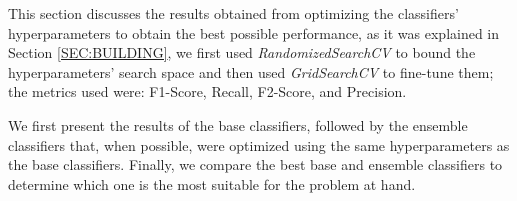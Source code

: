 This section discusses the results obtained from optimizing the classifiers' hyperparameters to obtain the best possible performance, as it was explained in Section \ref{SEC:BUILDING}, we first used \textit{RandomizedSearchCV} to bound the hyperparameters' search space and then used \textit{GridSearchCV} to fine-tune them; the metrics used were: F1-Score, Recall, F2-Score, and Precision.

We first present the results of the base classifiers, followed by the ensemble classifiers that, when possible, were optimized using the same hyperparameters as the base classifiers. Finally, we compare the best base and ensemble classifiers to determine which one is the most suitable for the problem at hand.